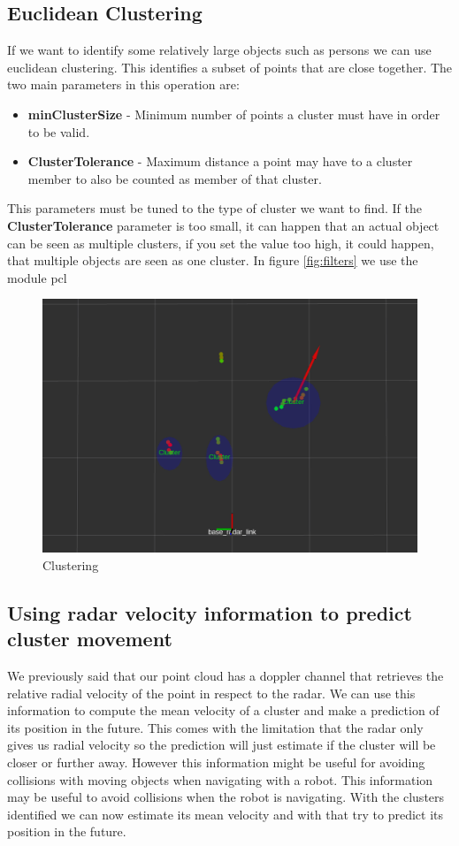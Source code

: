\documentclass[12pt]{article}
\begin{document}
\subsection{Euclidean Clustering}
If we want to identify some relatively large objects such as persons we can use euclidean clustering. This identifies a subset of points that are close together. The two main parameters in this operation are:
\begin{itemize}
\item \textbf{minClusterSize} - Minimum number of points a cluster must have in order to be valid.
\item \textbf{ClusterTolerance}  - Maximum distance a point may have to a cluster member to also be counted as member of that cluster.
\end{itemize}
This parameters must be tuned to the type of cluster we want to find. 
If the \textbf{ClusterTolerance} parameter is too small, it can happen that an actual object can be seen as multiple clusters, if you set the value too high, it could happen, that multiple objects are seen as one cluster.
In figure \ref{fig:filters} we use the module pcl
\begin{figure}[!htb]
    \centering
    \includegraphics[width=\linewidth]{cluster.png}
    \caption{Clustering}
    \label{fig:clustering}
\end{figure}
\subsection{Using radar velocity information to predict cluster movement}
We previously said that our point cloud has a doppler channel that retrieves the relative radial velocity of the point in respect to the radar. We can use this information to compute the mean velocity of a cluster and make a prediction of its position in the future. This comes with the limitation that the radar only gives us radial velocity so the prediction will just estimate if the cluster will be closer or further away. However this information might be useful for avoiding collisions with moving objects when navigating with a robot.
This information may be useful to avoid collisions when the robot is navigating. 
With the clusters identified we can now estimate its mean velocity and with that try to predict its position in the future. 
\end{document}
